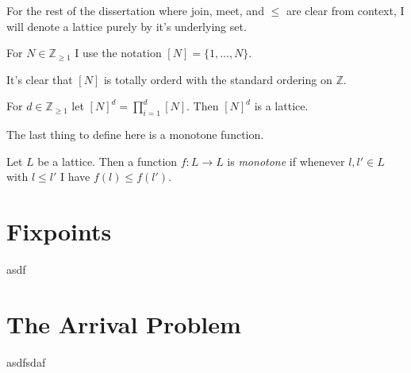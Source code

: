 For the rest of the dissertation where join, meet, and $\leq$ are clear from context, I will denote a lattice purely by it's underlying set.
\begin{notation}
  For $N \in \mathbb{Z}_{\geq 1}$ I use the notation $[N] = \{1, ..., N\}$.
\end{notation}
It's clear that $[N]$ is totally orderd with the standard ordering on $\mathbb{Z}$.
\begin{cor}
  For $d \in \mathbb{Z}_{\geq 1}$ let $[N]^d = \prod_{i=1}^d [N]$. Then $[N]^d$ is a lattice.
\end{cor}
The last thing to define here is a monotone function.
\begin{definition}
  Let $L$ be a lattice. Then a function $f : L \to L$ is \emph{monotone} if whenever $l, l' \in L$ with
  $l \leq l'$ I have $f(l) \leq f(l')$.
\end{definition}
\newpage
\section{Fixpoints}
asdf
\newpage
\section{The Arrival Problem}
asdfsdaf
